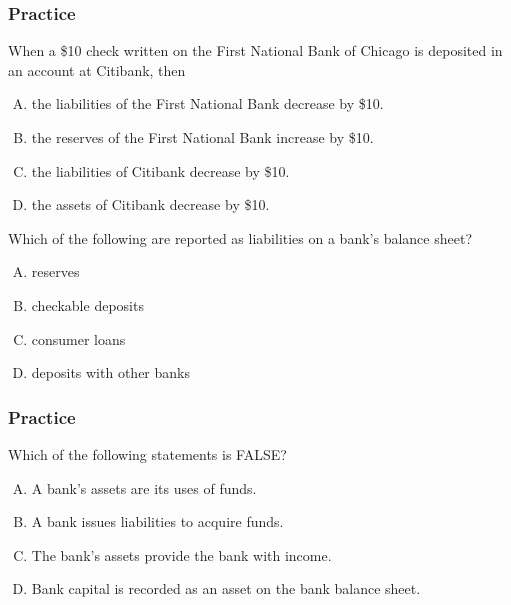 \documentclass{beamer}
\begin{document}
\begin{practiceframe}[t]
\frametitle{Practice}

When a \$10 check written on the First National Bank of Chicago is deposited in an account
at Citibank, then
\begin{enumerate}[A.]
    \item the liabilities of the First National Bank decrease by \$10.
    \item the reserves of the First National Bank increase by \$10.
    \item the liabilities of Citibank decrease by \$10.
    \item the assets of Citibank decrease by \$10.
\end{enumerate}
\vspace{1em}

Which of the following are reported as liabilities on a bank's balance sheet?
\begin{enumerate}[A. ]
    \item reserves
    \item checkable deposits
    \item consumer loans
    \item deposits with other banks
\end{enumerate}

\end{practiceframe}

\begin{practiceframe}[t]
\frametitle{Practice}

Which of the following statements is FALSE?
\begin{enumerate}[A. ]
    \item A bank's assets are its uses of funds.
    \item A bank issues liabilities to acquire funds.
    \item The bank's assets provide the bank with income.
    \item Bank capital is recorded as an asset on the bank balance sheet.
\end{enumerate}

\end{practiceframe}
\end{document}
